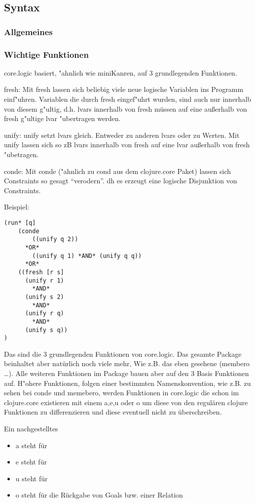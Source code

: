 \subsection{Syntax}

\subsubsection{Allgemeines}



\subsubsection{Wichtige Funktionen}

core.logic basiert, "ahnlich wie miniKanren, auf 3 grundlegenden Funktionen.

fresh:
Mit fresh lassen sich beliebig viele neue logische Variablen ins Programm einf"uhren. Variablen die durch fresh eingef"uhrt wurden, sind auch nur innerhalb von diesem g"ultig, d.h. lvars innerhalb von fresh müssen auf eine außerhalb von fresh g"ultige lvar "ubertragen werden.

unify:
unify setzt lvars gleich. Entweder zu anderen lvars oder zu Werten. Mit unify lassen sich so zB lvars innerhalb von fresh auf eine lvar außerhalb von fresh "ubetragen.

conde:
Mit conde ("ahnlich zu cond aus dem clojure.core Paket) lassen sich Constraints so gesagt “verodern”. dh es erzeugt eine logische Disjunktion von Constraints.

Beispiel:
\begin{lstlisting}
(run* [q]
    (conde
        ((unify q 2))
	  *OR*
        ((unify q 1) *AND* (unify q q))
	  *OR*
	((fresh [r s] 
	  (unify r 1)
	    *AND*
	  (unify s 2)
	    *AND*
	  (unify r q)
	    *AND*
	  (unify s q))
)
\end{lstlisting}

Das sind die 3 grundlegenden Funktionen von core.logic. Das gesamte Package beinhaltet aber natürlich noch viele mehr, Wie z.B. das eben gesehene (membero …). Alle weiteren Funktionen im Package bauen aber auf den 3 Basis Funktionen auf. H"ohere Funktionen, folgen einer bestimmten Namenskonvention, wie z.B. zu sehen bei conde und memebero, werden Funktionen in core.logic die schon im clojure.core existieren mit einem a,e,u oder o um diese von den regulären clojure Funktionen zu differenzieren und diese eventuell nicht zu überschreiben.

Ein nachgestelltes 
\begin{itemize}
  \item a steht für 
  
  \item e steht für 
  
  \item u steht für 
  
  \item o steht für die Rückgabe von Goals bzw. einer Relation

\end{itemize}

